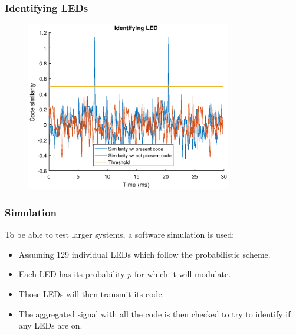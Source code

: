 \documentclass{beamer}
\begin{document}




	\begin{frame}\frametitle{Identifying LEDs}

		\begin{figure}
			\centering
			\includegraphics[width=0.8\textwidth]{correlation-results.eps}
		\end{figure}

	\end{frame}











	\begin{frame}\frametitle{Simulation}
		
		To be able to test larger systems, a software simulation is used: 

		\begin{itemize}

			\item Assuming 129 individual LEDs which follow the probabilistic scheme.

			\item Each LED has its probability $p$ for which it will modulate.

			\item Those LEDs will then transmit its code.

			\item The aggregated signal with all the code is then checked to try to identify if any LEDs are on.
		\end{itemize}

		

	\end{frame}
\end{document}
